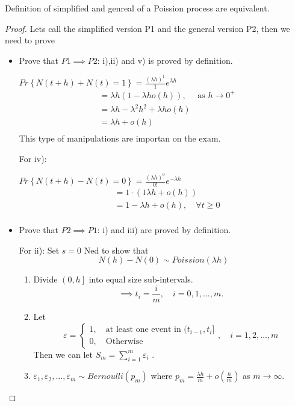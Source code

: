 \documentclass{article}
\theoremstyle{remark}
\newcommand{\newpara}
  {
  \vskip 0.4cm
  }
\begin{document}
\begin{theorem}
  Definition of simplified and genreal of a Poission process are equivalent.
\end{theorem}

\begin{proof}
  Lets call the simplified version P1 and the general version P2, then we need to prove 
  \begin{itemize}
    \item Prove that $P1 \implies  P2$: i),ii) and v) is proved by definition.
      
      \newpara
      
    $\displaystyle Pr \left \{  N\left( t + h \right) + N\left( t \right) = 1 \right \}  = \frac{\left( \lambda h \right)^{1}}{1}  e^{\lambda h}$ \[
        \begin{split}
     & = \lambda h \left( 1- \lambda  h o\left( h \right) \right) , \quad  \text{ as } h\to 0^{+}  \\ 
     &=  \lambda  h - \lambda ^{2} h^2 + \lambda h o\left( h \right) \\
     &=  \lambda h + o\left( h \right) \\
        \end{split} 
    \] 
    This type of manipulations are importan on the exam.
    
      For iv):
    \newpara
  $\displaystyle Pr \left \{ N\left( t+ h \right) - N\left( t \right) = 0 \right \} = \frac{\left( \lambda h \right)^{0}}{0!}  e^{-\lambda h}$ \[
  \begin{split}
    &=  1\cdot \left( 1  \lambda  h + o\left( h \right) \right) \\
    &= 1 - \lambda h + o\left( h \right), \quad \forall t\ge0  \\
  \end{split} 
  \] 
\item Prove that $P2 \implies  P1$: i) and iii) are proved by definition.
  
  \newpara
  For ii): Set $s = 0$ Ned to show that \[
  N\left( h \right) - N\left( 0 \right) \sim Poission\left( \lambda h \right)
  \] 
  \begin{enumerate}[label=(\roman*)]
    \item Divide $\left( 0, h \right ]$ into equal size sub-intervals.\[
    \implies  t_{i} = \frac{i}{m} , \quad  i=0,1, \ldots, m. 
    \] 
  \item Let \[
  \varepsilon = \begin{cases}
    1, \quad  \text{at least one event  in } (t_{i-1}, t_{i}] \\
    0, \quad \text{Otherwise} 
  \end{cases}
  , \quad  i = 1, 2, \ldots, m  
  \] 
  Then we can let $\displaystyle S_{m} = \sum_{i=1}^{m} \varepsilon _{i} $ .
\item $\displaystyle  \varepsilon _{1} , \varepsilon _{2}, \ldots , \varepsilon _{m} \sim Bernoulli\left( p_{m} \right) $ where $p_{m} = \frac{\lambda h}{m}  + o\left( \frac{h}{m} \right) $  as $ m\to  \infty$. 
  

\end{enumerate}
\end{itemize}
\end{proof}
\end{document}
